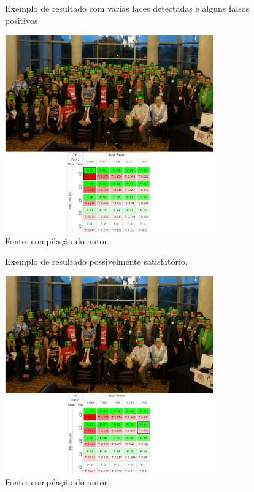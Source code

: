 \begin{figure}[h]
    \centering
    \caption[Exemplo de resultado com várias faces detectadas e alguns falsos positivos.]{Exemplo de resultado com várias faces detectadas e alguns falsos positivos.}
    \includegraphics[width=0.8\textwidth]{Cap3_Desenvolvimento/Figures/exemplo_resultado_2.jpg}
    \caption*{Fonte: compilação do autor.\footnotemark[\value{footnote}]}
    \label{fig:exemploResultado2}
\end{figure}

\begin{figure}[h]
    \centering
    \caption[Exemplo de resultado possivelmente satisfatório.]{Exemplo de resultado possivelmente satisfatório.}
    \includegraphics[width=0.8\textwidth]{Cap3_Desenvolvimento/Figures/exemplo_resultado_3.jpg}
    \caption*{Fonte: compilação do autor.\footnotemark[\value{footnote}]}
    \label{fig:exemploResultado3}
\end{figure}


